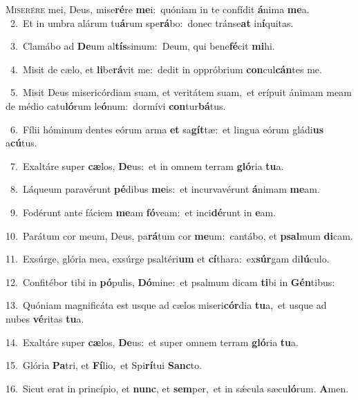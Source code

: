 \lettrine{\initial\textcolor{\initialcolor}{M}}{iserére} mei, Deus, mise\-\textbf{ré}\-re \textbf{me}\-i:~\star quóniam in te confídit \textbf{á}\-nima \textbf{me}\-a.\\
{\numbfont\textcolor{\numbcolor}{~2.}}~Et in umbra alárum tu\-\textbf{á}\-rum spe\-\textbf{rá}\-bo:~\star donec tránse\textbf{at} in\-\textbf{í}\-quitas.\par
{\numbfont\textcolor{\numbcolor}{~3.}}~Clamábo ad \textbf{De}\-um al\-\textbf{tís}\-simum:~\star Deum, qui bene\-\textbf{fé}\-cit \textbf{mi}\-hi.\par
{\numbfont\textcolor{\numbcolor}{~4.}}~Misit de cælo, et \textbf{li}\-be\-\textbf{rá}\-vit me:~\star dedit in oppróbrium \textbf{con}\-cul\-\textbf{cán}\-tes me.\par
{\numbfont\textcolor{\numbcolor}{~5.}}~Misit Deus misericórdiam suam, et veritátem suam,~\dagger et erípuit ánimam meam de médio catu\-\textbf{ló}\-rum le\-\textbf{ó}\-num:~\star dormívi \textbf{con}\-tur\-\textbf{bá}\-tus.\par
{\numbfont\textcolor{\numbcolor}{~6.}}~Fílii hóminum dentes eórum arma \textbf{et} sa\-\textbf{gít}\-tæ:~\star et lingua eórum gládi\textbf{us} a\-\textbf{cú}\-tus.\par
{\numbfont\textcolor{\numbcolor}{~7.}}~Exaltáre super \textbf{cæ}\-los, \textbf{De}\-us:~\star et in omnem terram \textbf{gló}\-ria \textbf{tu}\-a.\par
{\numbfont\textcolor{\numbcolor}{~8.}}~Láqueum paravérunt \textbf{pé}\-dibus \textbf{me}\-is:~\star et incurvavérunt \textbf{á}\-nimam \textbf{me}\-am.\par
{\numbfont\textcolor{\numbcolor}{~9.}}~Fodérunt ante fáciem \textbf{me}\-am \textbf{fó}\-veam:~\star et inci\-\textbf{dé}\-runt in \textbf{e}\-am.\par
{\numbfont\textcolor{\numbcolor}{10.}}~Parátum cor meum, Deus, pa\-\textbf{rá}\-tum cor \textbf{me}\-um:~\star cantábo, et \textbf{psal}\-mum \textbf{di}\-cam.\par
{\numbfont\textcolor{\numbcolor}{11.}}~Exsúrge, glória mea, exsúrge psaltéri\textbf{um} et \textbf{cí}\-thara:~\star ex\-\textbf{súr}\-gam di\-\textbf{lú}\-culo.\par
{\numbfont\textcolor{\numbcolor}{12.}}~Confitébor tibi in \textbf{pó}\-pulis, \textbf{Dó}\-mine:~\star et psalmum dicam \textbf{ti}\-bi in \textbf{Gén}\-tibus:\par
{\numbfont\textcolor{\numbcolor}{13.}}~Quóniam magnificáta est usque ad cælos miseri\-\textbf{cór}\-dia \textbf{tu}\-a,~\star et usque ad nubes \textbf{vé}\-ritas \textbf{tu}\-a.\par
{\numbfont\textcolor{\numbcolor}{14.}}~Exaltáre super \textbf{cæ}\-los, \textbf{De}\-us:~\star et super omnem terram \textbf{gló}\-ria \textbf{tu}\-a.\par
{\numbfont\textcolor{\numbcolor}{15.}}~Glória \textbf{Pa}\-tri, et \textbf{Fí}\-lio,~\star et Spi\-\textbf{rí}\-tui \textbf{Sanc}\-to.\par
{\numbfont\textcolor{\numbcolor}{16.}}~Sicut erat in princípio, et \textbf{nunc}\-, et \textbf{sem}\-per,~\star et in sǽcula sæcu\-\textbf{ló}\-rum. \textbf{A}\-men.\par
